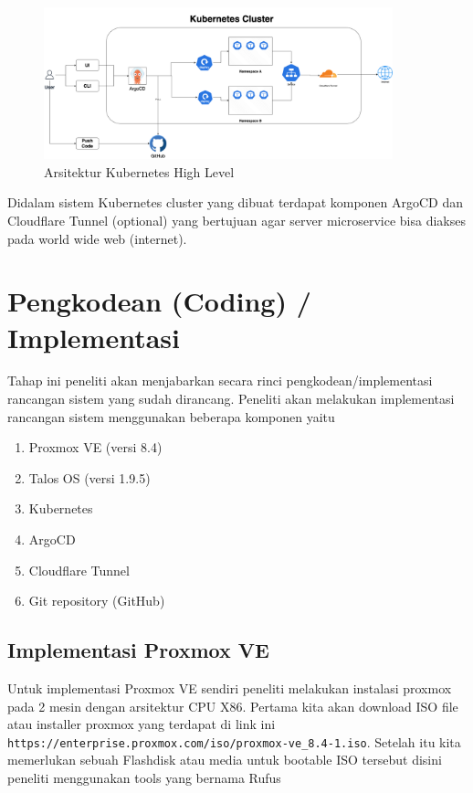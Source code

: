 \begin{figure}[H]
  \centering
  \includegraphics[width=0.9\textwidth]{figures/kube-new.png}
  \caption{Arsitektur Kubernetes High Level}
  \label{fig:arsitektur_kubernetes}
\end{figure}

Didalam sistem Kubernetes cluster yang dibuat terdapat komponen ArgoCD dan Cloudflare Tunnel (optional) yang bertujuan agar server
microservice bisa diakses pada world wide web (internet).

\section{Pengkodean (Coding) / Implementasi}
Tahap ini peneliti akan menjabarkan secara rinci pengkodean/implementasi rancangan sistem yang sudah dirancang.
Peneliti akan melakukan implementasi rancangan sistem menggunakan beberapa komponen yaitu
\begin{enumerate}
  \item Proxmox VE (versi 8.4)
  \item Talos OS (versi 1.9.5)
  \item Kubernetes
  \item ArgoCD
  \item Cloudflare Tunnel
  \item Git repository (GitHub)
\end{enumerate}

\subsection{Implementasi Proxmox VE}
Untuk implementasi Proxmox VE sendiri peneliti melakukan instalasi proxmox pada 2 mesin dengan arsitektur CPU X86.
Pertama kita akan download ISO file atau installer proxmox yang terdapat di link ini \verb|https://enterprise.proxmox.com/iso/proxmox-ve_8.4-1.iso|.
Setelah itu kita memerlukan sebuah Flashdisk atau media untuk bootable ISO tersebut disini peneliti menggunakan tools yang bernama Rufus

